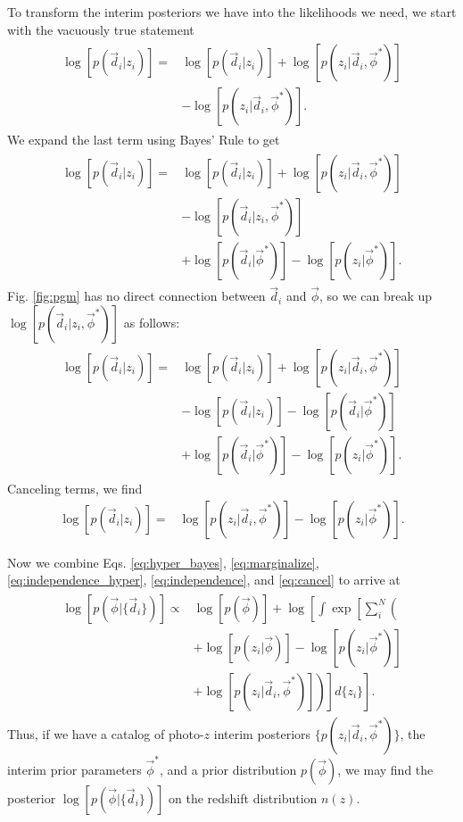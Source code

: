 \documentclass[iop]{emulateapj}
\begin{document}
To transform the interim posteriors we have into the likelihoods we need, we start with the vacuously true statement
\begin{align}
\begin{split}
\label{eq:unity}
\log[p(\vec{d}_{i} | z_{i})] =& \log[p(\vec{d}_{i} | z_{i})] + \log[p(z_{i} | \vec{d}_{i}, \vec{\phi}^{*})]\\
& - \log[p(z_{i} | \vec{d}_{i}, \vec{\phi}^{*})].
\end{split}
\end{align}
We expand the last term using Bayes' Rule to get
\begin{align}
\begin{split}
\label{eq:bayes}
\log[p(\vec{d}_{i} | z_{i})] =& \log[p(\vec{d}_{i} | z_{i})] + \log[p(z_{i} | \vec{d}_{i}, \vec{\phi}^{*})]\\
& - \log[p(\vec{d}_{i} | z_{i}, \vec{\phi}^{*})]\\
& + \log[p(\vec{d}_{i} | \vec{\phi}^{*})] - \log[p(z_{i} | \vec{\phi}^{*})].
\end{split}
\end{align}
Fig. \ref{fig:pgm} has no direct connection between $\vec{d}_{i}$ and $\vec{\phi}$, so we can break up $\log[p(\vec{d}_{i} | z_{i}, \vec{\phi}^{*})]$ as follows:
\begin{align}
\begin{split}
\label{eq:split}
\log[p(\vec{d}_{i} | z_{i})] =& \log[p(\vec{d}_{i} | z_{i})] + \log[p(z_{i} | \vec{d}_{i}, \vec{\phi}^{*})]\\
& - \log[p(\vec{d}_{i} | z_{i})] - \log[p(\vec{d}_{i} | \vec{\phi}^{*})]\\
& + \log[p(\vec{d}_{i} | \vec{\phi}^{*})] - \log[p(z_{i} | \vec{\phi}^{*})].
\end{split}
\end{align}
Canceling terms, we find
\begin{align}
\label{eq:cancel}
\log[p(\vec{d}_{i} | z_{i})] =& \log[p(z_{i} | \vec{d}_{i}, \vec{\phi}^{*})] - \log[p(z_{i} | \vec{\phi}^{*})].
\end{align}

Now we combine Eqs. \ref{eq:hyper_bayes}, \ref{eq:marginalize}, \ref{eq:independence_hyper}, \ref{eq:independence}, and \ref{eq:cancel} to arrive at 
\begin{align}
\begin{split}
\label{eq:final}
\log[p(\vec{\phi} | \{\vec{d}_{i}\})] \propto& \log[p(\vec{\phi})] + \log\left[\int \exp\left[\sum_{i}^{N} \left(\right.\right.\right.\\
& \left.\left.\left. + \log[p(z_{i} | \vec{\phi})] - \log[p(z_{i} | \vec{\phi}^{*})]\right.\right.\right.\\
& \left.\left.\left. + \log[p(z_{i} | \vec{d}_{i}, \vec{\phi}^{*})]
\right)\right] d\{z_{i}\}\right].
\end{split}
\end{align}
Thus, if we have a catalog of photo-$z$ interim posteriors $\{p(z_{i} | \vec{d}_{i}, \vec{\phi}^{*})\}$, the interim prior parameters $\vec{\phi}^{*}$, and a prior distribution $p(\vec{\phi})$, we may find the posterior $\log[p(\vec{\phi} | \{\vec{d}_{i}\})]$ on the redshift distribution $n(z)$.
\end{document}
